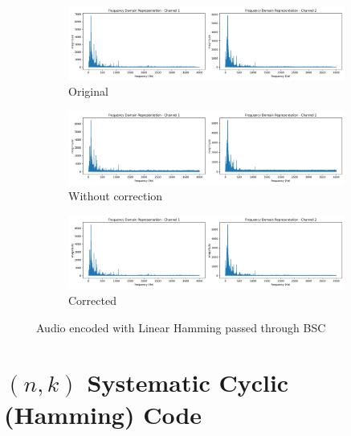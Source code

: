 \documentclass{article}
\begin{document}
\begin{figure}[htb]
    \centering
    \begin{subfigure}[b]{\textwidth}
        \centering
        \includegraphics[width=\textwidth]{../Result/wav-frequency-domain-TX.png}
        \caption{Original}
        \label{fig:f-audio-linear-bsc-original}
    \end{subfigure}
    \begin{subfigure}[b]{\textwidth}
        \centering
        \includegraphics[width=\textwidth]{../Result/linear-bsc-wav-frequency-domain-RX.png}
        \caption{Without correction}
        \label{fig:f-audio-linear-bsc-no-correction}
    \end{subfigure}
    \begin{subfigure}[b]{\textwidth}
        \centering
        \includegraphics[width=\textwidth]{../Result/linear-bsc-wav-frequency-domain-RX-syndrome-corrected.png}
        \caption{Corrected}
        \label{fig:f-audio-linear-bsc-syndrome-corrected}
    \end{subfigure}
       \caption{Audio encoded with Linear Hamming passed through BSC}
       \label{fig:f-audio-linear-bsc}
\end{figure}


\section{$(n,k)$ Systematic Cyclic (Hamming) Code}
\end{document}
